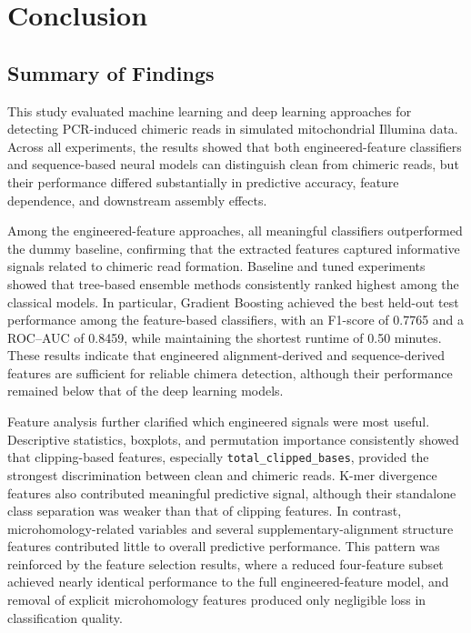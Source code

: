 \chapter{Conclusion}

\section{Summary of Findings}

This study evaluated machine learning and deep learning approaches for detecting PCR-induced chimeric reads in simulated mitochondrial Illumina data. Across all experiments, the results showed that both engineered-feature classifiers and sequence-based neural models can distinguish clean from chimeric reads, but their performance differed substantially in predictive accuracy, feature dependence, and downstream assembly effects.

Among the engineered-feature approaches, all meaningful classifiers outperformed the dummy baseline, confirming that the extracted features captured informative signals related to chimeric read formation. Baseline and tuned experiments showed that tree-based ensemble methods consistently ranked highest among the classical models. In particular, Gradient Boosting achieved the best held-out test performance among the feature-based classifiers, with an F1-score of 0.7765 and a ROC--AUC of 0.8459, while maintaining the shortest runtime of 0.50 minutes. These results indicate that engineered alignment-derived and sequence-derived features are sufficient for reliable chimera detection, although their performance remained below that of the deep learning models.

Feature analysis further clarified which engineered signals were most useful. Descriptive statistics, boxplots, and permutation importance consistently showed that clipping-based features, especially \texttt{total\_clipped\_bases}, provided the strongest discrimination between clean and chimeric reads. K-mer divergence features also contributed meaningful predictive signal, although their standalone class separation was weaker than that of clipping features. In contrast, microhomology-related variables and several supplementary-alignment structure features contributed little to overall predictive performance. This pattern was reinforced by the feature selection results, where a reduced four-feature subset achieved nearly identical performance to the full engineered-feature model, and removal of explicit microhomology features produced only negligible loss in classification quality.

